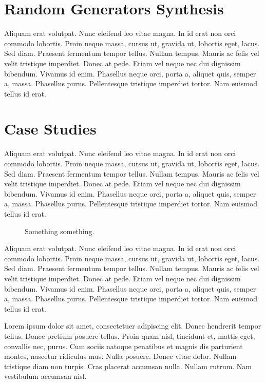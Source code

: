 \documentclass[conference, fleqn]{IEEEtran}
\begin{document}
\newpage

\section{Random Generators Synthesis} \label{sec:synthesis}

Aliquam erat volutpat. Nunc eleifend leo vitae magna. In id erat non orci
commodo lobortis. Proin neque massa, cursus ut, gravida ut, lobortis eget,
lacus. Sed diam. Praesent fermentum tempor tellus. Nullam tempus. Mauris ac
felis vel velit tristique imperdiet. Donec at pede. Etiam vel neque nec dui
dignissim bibendum. Vivamus id enim. Phasellus neque orci, porta a, aliquet
quis, semper a, massa. Phasellus purus. Pellentesque tristique imperdiet tortor.
Nam euismod tellus id erat.

\newpage

\section{Case Studies}

Aliquam erat volutpat. Nunc eleifend leo vitae magna. In id erat non orci
commodo lobortis. Proin neque massa, cursus ut, gravida ut, lobortis eget,
lacus. Sed diam. Praesent fermentum tempor tellus. Nullam tempus. Mauris ac
felis vel velit tristique imperdiet. Donec at pede. Etiam vel neque nec dui
dignissim bibendum. Vivamus id enim. Phasellus neque orci, porta a, aliquet
quis, semper a, massa. Phasellus purus. Pellentesque tristique imperdiet tortor.
Nam euismod tellus id erat.

\begin{figure}[t]
  \centering
  
  \caption{Something something.}
  \label{fig:html}
\end{figure}

Aliquam erat volutpat. Nunc eleifend leo vitae magna. In id erat non orci
commodo lobortis. Proin neque massa, cursus ut, gravida ut, lobortis eget,
lacus. Sed diam. Praesent fermentum tempor tellus. Nullam tempus. Mauris ac
felis vel velit tristique imperdiet. Donec at pede. Etiam vel neque nec dui
dignissim bibendum. Vivamus id enim. Phasellus neque orci, porta a, aliquet
quis, semper a, massa. Phasellus purus. Pellentesque tristique imperdiet tortor.
Nam euismod tellus id erat.

Lorem ipsum dolor sit amet, consectetuer adipiscing elit. Donec hendrerit tempor
tellus. Donec pretium posuere tellus. Proin quam nisl, tincidunt et, mattis
eget, convallis nec, purus. Cum sociis natoque penatibus et magnis dis
parturient montes, nascetur ridiculus mus. Nulla posuere. Donec vitae dolor.
Nullam tristique diam non turpis. Cras placerat accumsan nulla. Nullam rutrum.
Nam vestibulum accumsan nisl.
\end{document}

